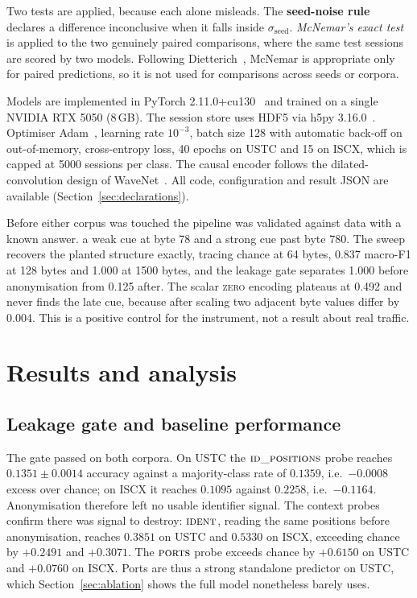 \documentclass[pdflatex,sn-mathphys-num]{sn-jnl}
\theoremstyle{thmstyleone}%
\theoremstyle{thmstylethree}%
\begin{document}
Two tests are applied, because each alone misleads. The \textbf{seed-noise
rule} declares a difference inconclusive when it falls inside
$\sigma_{\text{seed}}$. \emph{McNemar's exact test}~\cite{mcnemar} is applied
to the two genuinely paired comparisons, where the same test sessions are
scored by two models. Following Dietterich~\cite{dietterich}, McNemar is
appropriate only for paired predictions, so it is not used for comparisons
across seeds or corpora.

Models are implemented in PyTorch 2.11.0+cu130~\cite{pytorch} and trained on a
single NVIDIA RTX 5050 (8\,GB). The session store uses HDF5 via h5py
3.16.0~\cite{hdf5}. Optimiser Adam~\cite{adam}, learning rate $10^{-3}$, batch size 128
with automatic back-off on out-of-memory, cross-entropy loss, 40 epochs on
USTC and 15 on ISCX, which is capped at 5000 sessions per class. The causal
encoder follows the dilated-convolution design of WaveNet~\cite{wavenet}. All
code, configuration and result JSON are available
(Section~\ref{sec:declarations}).

Before either corpus was touched the pipeline was validated against data
with a known answer. a weak cue at byte 78 and a strong cue past byte
780. The sweep recovers the planted structure exactly, tracing chance at 64
bytes, 0.837 macro-F1 at 128 bytes and 1.000 at 1500 bytes, and the leakage
gate separates 1.000 before anonymisation from 0.125 after. The scalar
\textsc{zero} encoding plateaus at 0.492 and never finds the late cue, because
after scaling two adjacent byte values differ by 0.004. This is a positive
control for the instrument, not a result about real traffic.

\section{Results and analysis}\label{sec:results}

\subsection{Leakage gate and baseline performance}

The gate passed on both corpora. On USTC the
$\textsc{id\_positions}$ probe reaches $0.1351 \pm 0.0014$ accuracy against a
majority-class rate of $0.1359$, i.e.\ $-0.0008$ excess over chance; on ISCX it
reaches $0.1095$ against $0.2258$, i.e.\ $-0.1164$. Anonymisation therefore
left no usable identifier signal. The context probes confirm there was signal
to destroy: $\textsc{ident}$, reading the same positions before anonymisation,
reaches $0.3851$ on USTC and $0.5330$ on ISCX, exceeding chance by $+0.2491$
and $+0.3071$. The $\textsc{ports}$ probe exceeds chance by $+0.6150$ on USTC
and $+0.0760$ on ISCX. Ports are thus a strong standalone predictor on USTC,
which Section~\ref{sec:ablation} shows the full model nonetheless barely uses.
\end{document}
